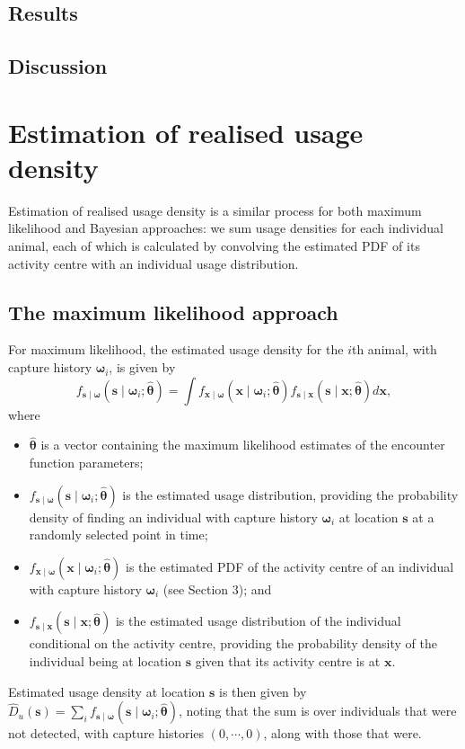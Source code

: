 \documentclass[10pt,a4paper]{article}\usepackage[]{graphicx}\usepackage[]{color}
\begin{document}
\subsection{Results}
\label{sec:appendix-results}

\subsection{Discussion}
\label{sec:appendix-discussion}

\section{Estimation of realised usage density}

Estimation of realised usage density is a similar process for both
maximum likelihood and Bayesian approaches: we sum usage densities for
each individual animal, each of which is calculated by convolving the
estimated PDF of its activity centre with an individual usage
distribution.

\subsection{The maximum likelihood approach}

For maximum likelihood, the estimated usage density for the $i$th
animal, with capture history $\bm{\omega}_i$, is given by
\begin{equation}
f_{\bm{s} \mid \bm{\omega}}(\bm{s} \mid \bm{\omega}_i; \bm{\widehat{\theta}}) =
\int f_{\bm{x} \mid \bm{\omega}}(\bm{x} \mid \bm{\omega}_i; \bm{\widehat{\theta}})
f_{\bm{s} \mid \bm{x}}(\bm{s} \mid \bm{x}; \bm{\widehat{\theta}}) d\bm{x}, \label{eq:ind-usage}
\end{equation}
where
\begin{itemize}
\item $\bm{\widehat{\theta}}$ is a vector containing the maximum
  likelihood estimates of the encounter function parameters;
\item $f_{\bm{s} \mid \bm{\omega}}(\bm{s} \mid
  \bm{\omega}_i; \bm{\widehat{\theta}})$ is the estimated usage distribution, providing the
  probability density of finding an individual with capture history
  $\bm{\omega}_i$ at location $\bm{s}$ at a randomly selected point in
  time;
\item $f_{\bm{x} \mid \bm{\omega}}(\bm{x} \mid \bm{\omega}_i;
  \bm{\widehat{\theta}})$ is the estimated PDF of the activity centre
  of an individual with capture history $\bm{\omega}_i$ (see Section
  3); and
\item $f_{\bm{s} \mid \bm{x}}(\bm{s} \mid \bm{x}; \bm{\widehat{\theta}})$ is the
  estimated usage distribution of the individual conditional on the
  activity centre, providing the probability density of the individual
  being at location $\bm{s}$ given that its activity centre is at
  $\bm{x}$.
\end{itemize}
Estimated usage density at location $\bm{s}$ is then given by
$\widehat{D}_u(\bm{s}) = \sum_i f_{\bm{s} \mid
  \bm{\omega}}(\bm{s} \mid \bm{\omega}_i; \bm{\widehat{\theta}})$, noting that the sum is
over individuals that were not detected, with capture histories $(0,
\cdots, 0)$, along with those that were.
\end{document}
